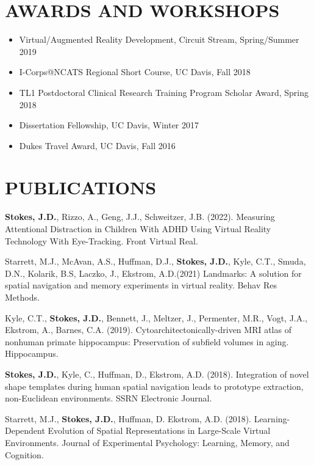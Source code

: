 \documentclass[line,margin,10pt]{res}
\begin{document}
\begin{resume}

\section{AWARDS AND WORKSHOPS}
\begin{itemize} \itemsep -2pt
\item Virtual/Augmented Reality Development, Circuit Stream, Spring/Summer 2019
\item I-Corps@NCATS Regional Short Course, UC Davis, Fall 2018
\item TL1 Postdoctoral Clinical Research Training Program Scholar Award, Spring 2018
\item Dissertation Fellowship, UC Davis, Winter 2017
\item Dukes Travel Award, UC Davis, Fall 2016
\end{itemize}

\section{PUBLICATIONS}

\textbf{Stokes, J.D.}, Rizzo, A., Geng, J.J., Schweitzer, J.B. (2022). Measuring Attentional Distraction in Children With ADHD Using Virtual Reality Technology With Eye-Tracking. Front Virtual Real.

Starrett, M.J., McAvan, A.S., Huffman, D.J., \textbf{Stokes, J.D.}, Kyle, C.T., Smuda, D.N., Kolarik, B.S, Laczko, J., Ekstrom, A.D.(2021) Landmarks: A solution for spatial navigation and memory experiments in virtual reality. Behav Res Methods.

Kyle, C.T., \textbf{Stokes, J.D.}, Bennett, J., Meltzer, J., Permenter, M.R., Vogt, J.A., Ekstrom, A., Barnes, C.A. (2019). Cytoarchitectonically-driven MRI atlas of nonhuman primate hippocampus: Preservation of subfield volumes in aging. Hippocampus.

\textbf{Stokes, J.D.}, Kyle, C., Huffman, D., Ekstrom, A.D. (2018). Integration of novel shape templates during human spatial navigation leads to prototype extraction, non-Euclidean environments. SSRN Electronic Journal.

Starrett, M.J., \textbf{Stokes, J.D.}, Huffman, D. Ekstrom, A.D. (2018). Learning-Dependent Evolution of Spatial Representations in Large-Scale Virtual Environments. Journal of Experimental Psychology: Learning, Memory, and Cognition.


\end{resume}
\end{document}

